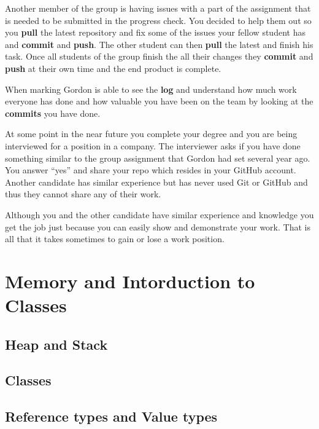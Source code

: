 \documentclass[
]{book}
\begin{document}
Another member of the group is having issues with a part of the assignment that is needed to be submitted in the progress check. You decided to help them out so you \textbf{pull} the latest repository and fix some of the issues your fellow student has and \textbf{commit} and \textbf{push}. The other student can then \textbf{pull} the latest and finish his task. Once all students of the group finish the
all their changes they \textbf{commit} and \textbf{push} at their own time and the end product is complete.

When marking Gordon is able to see the \textbf{log} and understand how much work everyone has done and how valuable you have been on the team by looking at the \textbf{commits} you have done.

At some point in the near future you complete your degree and you are being interviewed for a position in a company.
The interviewer asks if you have done something similar to the group assignment that Gordon had set several year ago. You answer ``yes'' and share your repo which resides in your GitHub account.
Another candidate has similar experience but has never used Git or GitHub and thus they cannot share any of their work.

Although you and the other candidate have similar experience and knowledge you get the job just because you can easily show and demonstrate your work. That is all that it takes sometimes to gain or lose a work position.

\hypertarget{memory-and-intorduction-to-classes}{%
\chapter{Memory and Intorduction to Classes}\label{memory-and-intorduction-to-classes}}

\hypertarget{heap-and-stack}{%
\section{Heap and Stack}\label{heap-and-stack}}

\hypertarget{classes}{%
\section{Classes}\label{classes}}

\hypertarget{reference-types-and-value-types}{%
\section{Reference types and Value types}\label{reference-types-and-value-types}}
\end{document}
